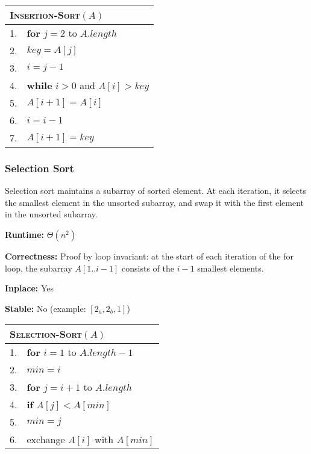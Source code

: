 \documentclass[a4paper,12pt]{article}
\begin{document}
\begin{center}
	\begin{tabular}{ll}
		\toprule
		\multicolumn{2}{l}{\textsc{Insertion-Sort}$(A)$} \\
		\midrule
		1. & \textbf{for} $j = 2$ to $A.length$ \\
		2. & \quad $key = A[j]$ \\
		3. & \quad $i = j - 1$ \\
		4. & \quad \textbf{while} $i > 0$ and $A[i] > key$ \\
		5. & \quad \quad $A[i + 1] = A[i]$ \\
		6. & \quad \quad $i = i - 1$ \\
		7. & \quad $A[i + 1] = key$ \\
		\bottomrule
	\end{tabular}
\end{center}

\subsubsection{Selection Sort}

Selection sort maintains a subarray of sorted element.
At each iteration, it selects the smallest element in the unsorted subarray, and swap it with the first element in the unsorted subarray.

\textbf{Runtime:} 
$\Theta(n^2)$

\textbf{Correctness:} 
Proof by loop invariant: at the start of each iteration of the for loop, the subarray $A[1..i - 1]$ consists of the $i - 1$ smallest elements.

\textbf{Inplace:} 
Yes

\textbf{Stable:}
No (example: $[2_a, 2_b, 1]$)

\begin{center}
	\begin{tabular}{ll}
		\toprule
		\multicolumn{2}{l}{\textsc{Selection-Sort}$(A)$} \\
		\midrule
		1. & \textbf{for} $i = 1$ to $A.length - 1$ \\
		2. & \quad $min = i$ \\
		3. & \quad \textbf{for} $j = i + 1$ to $A.length$ \\
		4. & \quad \quad \textbf{if} $A[j] < A[min]$ \\
		5. & \quad \quad \quad $min = j$ \\
		6. & \quad exchange $A[i]$ with $A[min]$ \\
		\bottomrule
	\end{tabular}
\end{center}
\end{document}
